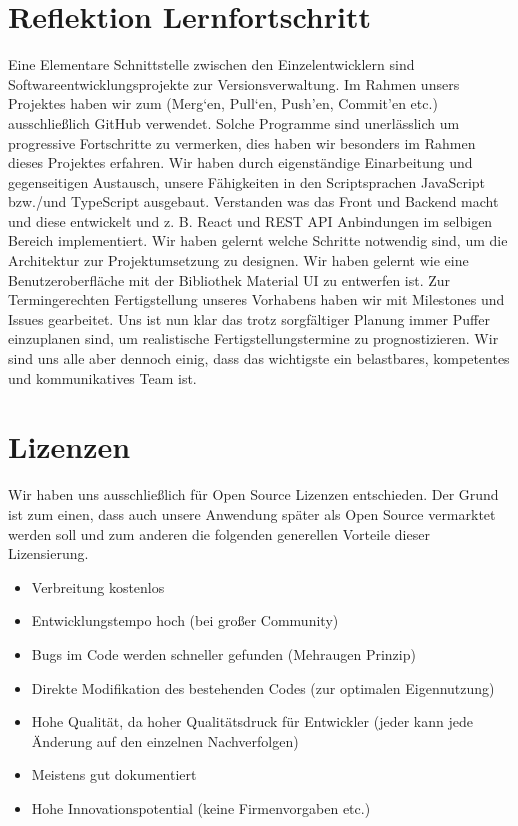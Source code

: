 \section{Reflektion Lernfortschritt}
Eine Elementare Schnittstelle zwischen den Einzelentwicklern sind Softwareentwicklungsprojekte zur Versionsverwaltung. 
Im Rahmen unsers Projektes haben wir zum (Merg‘en, Pull‘en, Push’en, Commit’en etc.) ausschließlich GitHub verwendet. 
Solche Programme sind unerlässlich um progressive Fortschritte zu vermerken, dies haben wir besonders im Rahmen dieses Projektes erfahren. 
Wir haben durch eigenständige Einarbeitung und gegenseitigen Austausch, unsere Fähigkeiten in den Scriptsprachen JavaScript bzw./und TypeScript ausgebaut. 
Verstanden was das  Front und Backend macht und diese entwickelt und z. B. React und REST API Anbindungen im selbigen Bereich implementiert. 
Wir haben gelernt welche Schritte notwendig sind, um die Architektur zur Projektumsetzung zu designen. 
Wir haben gelernt wie eine Benutzeroberfläche mit der Bibliothek Material UI zu entwerfen ist. 
Zur Termingerechten Fertigstellung unseres Vorhabens haben wir mit Milestones und Issues gearbeitet. 
Uns ist nun klar das trotz sorgfältiger Planung immer Puffer einzuplanen sind, um realistische Fertigstellungstermine zu prognostizieren. 
Wir sind uns alle aber dennoch einig, dass das wichtigste ein belastbares, kompetentes und kommunikatives Team ist.  

\section{Lizenzen}
Wir haben uns ausschließlich für Open Source Lizenzen entschieden. 
Der Grund ist zum einen, dass auch unsere Anwendung später als Open Source vermarktet werden soll und zum anderen die folgenden generellen Vorteile dieser Lizensierung.

\begin{itemize}
    \item	Verbreitung kostenlos
    \item   Entwicklungstempo hoch (bei großer Community)
    \item   Bugs im Code werden schneller gefunden (Mehraugen Prinzip)
    \item	Direkte Modifikation des bestehenden Codes (zur optimalen Eigennutzung)
    \item	Hohe Qualität, da hoher Qualitätsdruck für Entwickler (jeder kann jede Änderung auf den einzelnen Nachverfolgen)
    \item	Meistens gut dokumentiert
    \item	Hohe Innovationspotential (keine Firmenvorgaben etc.)
\end{itemize}

